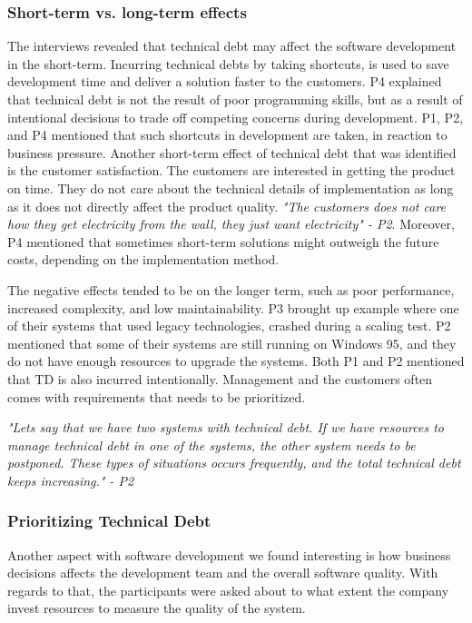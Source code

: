 \subsubsection{Short-term vs. long-term effects}
The interviews revealed that technical debt may affect the software development in the short-term. Incurring technical debts by taking shortcuts, is used to save development time and deliver a solution faster to the customers. P4 explained that technical debt is not the result of poor programming skills, but as a result of intentional decisions to trade off competing concerns during development. P1, P2, and P4 mentioned that such shortcuts in development are taken, in reaction to business pressure. Another short-term effect of technical debt that was identified is the customer satisfaction. The customers are interested in getting the product on time. They do not care about the technical details of implementation as long as it does not directly affect the product quality. \textit{"The customers does not care how they get electricity from the wall, they just want electricity" - P2}. Moreover, P4 mentioned that sometimes short-term solutions might outweigh the future costs, depending on the implementation method.

The negative effects tended to be on the longer term, such as poor performance, increased complexity, and low maintainability. P3 brought up example where one of their systems that used legacy technologies, crashed during a scaling test. P2 mentioned that some of their systems are still running on Windows 95, and they do not have enough resources to upgrade the systems. Both P1 and P2 mentioned that TD is also incurred intentionally. Management and the customers often comes with requirements that needs to be prioritized. 

\begin{displayquote}
    \textit{"Lets say that we have two systems with technical debt. If we have resources to manage technical debt in one of the systems, the other system needs to be postponed. These types of situations occurs frequently, and the total technical debt keeps increasing." - P2}
\end{displayquote}


\subsubsection{Prioritizing Technical Debt}
Another aspect with software development we found interesting is how business decisions affects the development team and the overall software quality. With regards to that, the participants were asked about to what extent the company invest resources to measure the quality of the system.

